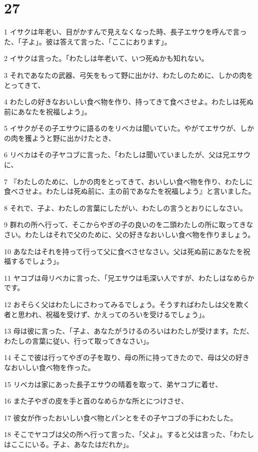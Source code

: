 \chapter{27}

\par 1 イサクは年老い、目がかすんで見えなくなった時、長子エサウを呼んで言った、「子よ」。彼は答えて言った、「ここにおります」。
\par 2 イサクは言った。「わたしは年老いて、いつ死ぬかも知れない。
\par 3 それであなたの武器、弓矢をもって野に出かけ、わたしのために、しかの肉をとってきて、
\par 4 わたしの好きなおいしい食べ物を作り、持ってきて食べさせよ。わたしは死ぬ前にあなたを祝福しよう」。
\par 5 イサクがその子エサウに語るのをリベカは聞いていた。やがてエサウが、しかの肉を獲ようと野に出かけたとき、
\par 6 リベカはその子ヤコブに言った、「わたしは聞いていましたが、父は兄エサウに、
\par 7 『わたしのために、しかの肉をとってきて、おいしい食べ物を作り、わたしに食べさせよ。わたしは死ぬ前に、主の前であなたを祝福しよう』と言いました。
\par 8 それで、子よ、わたしの言葉にしたがい、わたしの言うとおりにしなさい。
\par 9 群れの所へ行って、そこからやぎの子の良いのを二頭わたしの所に取ってきなさい。わたしはそれで父のために、父の好きなおいしい食べ物を作りましょう。
\par 10 あなたはそれを持って行って父に食べさせなさい。父は死ぬ前にあなたを祝福するでしょう」。
\par 11 ヤコブは母リベカに言った、「兄エサウは毛深い人ですが、わたしはなめらかです。
\par 12 おそらく父はわたしにさわってみるでしょう。そうすればわたしは父を欺く者と思われ、祝福を受けず、かえってのろいを受けるでしょう」。
\par 13 母は彼に言った、「子よ、あなたがうけるのろいはわたしが受けます。ただ、わたしの言葉に従い、行って取ってきなさい」。
\par 14 そこで彼は行ってやぎの子を取り、母の所に持ってきたので、母は父の好きなおいしい食べ物を作った。
\par 15 リベカは家にあった長子エサウの晴着を取って、弟ヤコブに着せ、
\par 16 また子やぎの皮を手と首のなめらかな所とにつけさせ、
\par 17 彼女が作ったおいしい食べ物とパンとをその子ヤコブの手にわたした。
\par 18 そこでヤコブは父の所へ行って言った、「父よ」。すると父は言った、「わたしはここにいる。子よ、あなたはだれか」。
